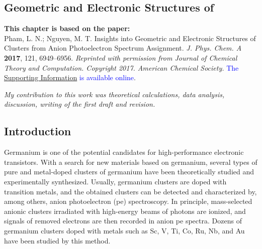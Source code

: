 
\begin{refsection}

\chapter[Vanadium Trigermanium \ch{VG\lowercase{e}3}]{Geometric and Electronic Structures of } \label{VGe3}


\begin{shaded}
\textbf{This chapter is based on the paper:}\\
Pham, L. N.; Nguyen, M. T. Insights into Geometric and Electronic Structures of  Clusters from Anion Photoelectron Spectrum Assignment. \textit{J. Phys. Chem. A} \textbf{2017}, 121, 6949–6956.  \textit{Reprinted with permission from Journal of Chemical Theory and Computation. Copyright 2017. American Chemical Society.} \textcolor{blue}{The \href{https://pubs.acs.org/doi/suppl/10.1021/acs.jpca.7b07459/suppl_file/jp7b07459_si_001.pdf}{Supporting Information} is available online}.

\emph{My contribution to this work was theoretical calculations, data analysis, discussion, writing of the first draft and revision.}
\newpage
\end{shaded}


\section{Introduction}

Germanium is one of the potential candidates for high-performance electronic transistors. \cite{c5:1} With a search for new materials based on germanium, several types of pure and metal-doped clusters of germanium have been theoretically studied and experimentally synthesized. \cite{c5:2, c5:3, c5:4, c5:5, c5:6, c5:7, c5:8, c5:9, c5:10, c5:11, c5:12} Usually, germanium clusters are doped with transition metals, and the obtained clusters can be detected and characterized by, among others, anion photoelectron (\acrshort{pe}) spectroscopy. In principle, mass-selected anionic clusters irradiated with high-energy beams of photons are ionized, and signals of removed electrons are then recorded in anion \acrshort{pe} spectra. Dozens of germanium clusters doped with metals such as Sc, V, Ti, Co, Ru, Nb, and Au have been studied by this method. \cite{c5:2, c5:6, c5:7, c5:8, c5:9, c5:11} 






\end{refsection}
